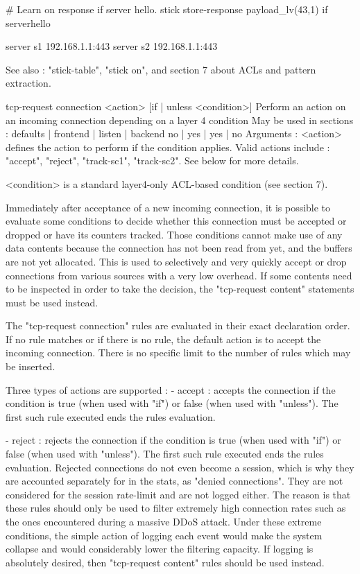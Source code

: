         # Learn on response if server hello.
        stick store-response payload_lv(43,1) if serverhello

        server s1 192.168.1.1:443
        server s2 192.168.1.1:443

  See also : "stick-table", "stick on", and section 7 about ACLs and pattern
             extraction.


tcp-request connection <action> [{if | unless} <condition>]
  Perform an action on an incoming connection depending on a layer 4 condition
  May be used in sections :   defaults | frontend | listen | backend
                                 no    |    yes   |   yes  |   no
  Arguments :
    <action>    defines the action to perform if the condition applies. Valid
                actions include : "accept", "reject", "track-sc1", "track-sc2".
                See below for more details.

    <condition> is a standard layer4-only ACL-based condition (see section 7).

  Immediately after acceptance of a new incoming connection, it is possible to
  evaluate some conditions to decide whether this connection must be accepted
  or dropped or have its counters tracked. Those conditions cannot make use of
  any data contents because the connection has not been read from yet, and the
  buffers are not yet allocated. This is used to selectively and very quickly
  accept or drop connections from various sources with a very low overhead. If
  some contents need to be inspected in order to take the decision, the
  "tcp-request content" statements must be used instead.

  The "tcp-request connection" rules are evaluated in their exact declaration
  order. If no rule matches or if there is no rule, the default action is to
  accept the incoming connection. There is no specific limit to the number of
  rules which may be inserted.

  Three types of actions are supported :
    - accept :
        accepts the connection if the condition is true (when used with "if")
        or false (when used with "unless"). The first such rule executed ends
        the rules evaluation.

    - reject :
        rejects the connection if the condition is true (when used with "if")
        or false (when used with "unless"). The first such rule executed ends
        the rules evaluation. Rejected connections do not even become a
        session, which is why they are accounted separately for in the stats,
        as "denied connections". They are not considered for the session
        rate-limit and are not logged either. The reason is that these rules
        should only be used to filter extremely high connection rates such as
        the ones encountered during a massive DDoS attack. Under these extreme
        conditions, the simple action of logging each event would make the
        system collapse and would considerably lower the filtering capacity. If
        logging is absolutely desired, then "tcp-request content" rules should
        be used instead.

